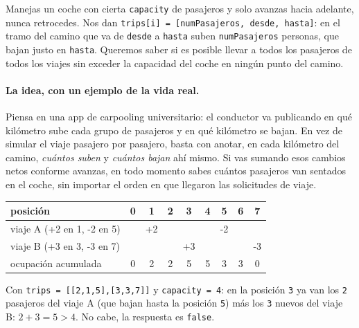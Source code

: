 
Manejas un coche con cierta \texttt{capacity} de pasajeros y solo avanzas
hacia adelante, nunca retrocedes. Nos dan \texttt{trips[i] = [numPasajeros,
desde, hasta]}: en el tramo del camino que va de \texttt{desde} a
\texttt{hasta} suben \texttt{numPasajeros} personas, que bajan justo en
\texttt{hasta}. Queremos saber si es posible llevar a todos los pasajeros de
todos los viajes sin exceder la capacidad del coche en ningún punto del
camino.

\paragraph{La idea, con un ejemplo de la vida real.} Piensa en una app de
carpooling universitario: el conductor va publicando en qué kilómetro sube
cada grupo de pasajeros y en qué kilómetro se bajan. En vez de simular el
viaje pasajero por pasajero, basta con anotar, en cada kilómetro del
camino, \emph{cuántos suben} y \emph{cuántos bajan} ahí mismo. Si vas
sumando esos cambios netos conforme avanzas, en todo momento sabes cuántos
pasajeros van sentados en el coche, sin importar el orden en que llegaron
las solicitudes de viaje.

\begin{center}
\ttfamily
\begin{tabular}{l|cccccccc}
posición & 0 & 1 & 2 & 3 & 4 & 5 & 6 & 7\\
\hline
viaje A (+2 en 1, -2 en 5) & & +2 & & & & -2 & &\\
viaje B (+3 en 3, -3 en 7) & & & & +3 & & & & -3\\
ocupación acumulada & 0 & 2 & 2 & 5 & 5 & 3 & 3 & 0\\
\end{tabular}
\end{center}

\noindent Con \texttt{trips = [[2,1,5],[3,3,7]]} y \texttt{capacity = 4}: en
la posición \texttt{3} ya van los \texttt{2} pasajeros del viaje A (que
bajan hasta la posición \texttt{5}) más los \texttt{3} nuevos del viaje B:
$2+3=5 > 4$. No cabe, la respuesta es \texttt{false}.

